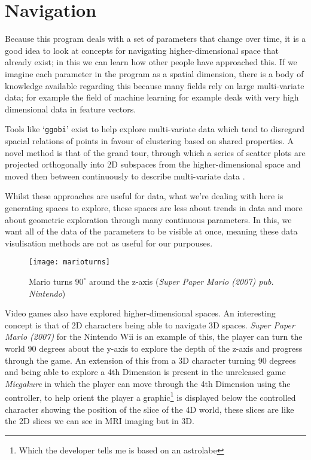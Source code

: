 \section{Navigation}
Because this program deals with a set of parameters that change over time, it is
a good idea to look at concepts for navigating higher-dimensional space that
already exist; in this we can learn how other people have approached this. If we
imagine each parameter in the program as a spatial dimension, there is a body of
knowledge available regarding this because many fields rely on large
multi-variate data; for example the field of machine learning for example deals
with very high dimensional data in feature vectors.

Tools like `\verb|ggobi|' exist to help explore multi-variate data
\citep{swayne:dsc2003} which tend to disregard spacial relations of points in
favour of clustering based on shared properties. A novel method is that of the
grand tour, through which a series of scatter plots are projected orthogonally
into 2D subspaces from the higher-dimensional space and moved then between
continuously to describe multi-variate data \citep{asimov1985grand}.

Whilst these approaches are useful for data, what we're dealing with here is
generating spaces to explore, these spaces are less about trends in data and
more about geometric exploration through many continuous parameters. In this, we
want all of the data of the parameters to be visible at once, meaning these data
visulisation methods are not as useful for our purpouses.

\begin{figure}[H]
    \centering
    \texttt{[image: marioturns]}
    \caption{Mario turns $90^\circ$ around the z-axis (\emph{Super Paper Mario
    (2007) pub. Nintendo})}
\end{figure}

Video games also have explored higher-dimensional spaces. An interesting concept
is that of 2D characters being able to navigate 3D spaces.  \emph{Super Paper
Mario (2007)} for the Nintendo Wii is an example of this, the player can turn
the world 90 degrees about the y-axis to explore the depth of the z-axis and
progress through the game. An extension of this from a 3D character turning 90
degrees and being able to explore a 4th Dimension is present in the unreleased
game \emph{Miegakure} in which the player can move through the 4th Dimension
using the controller, to help orient the player a graphic\footnote{Which the
developer tells me is based on an astrolabe} is displayed below the controlled
character showing the position of the slice of the 4D world, these slices are
like the 2D slices we can see in MRI imaging but in 3D.

